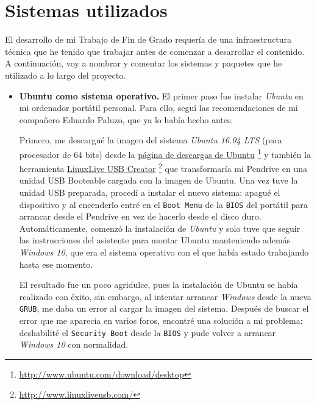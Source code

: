 \section {Sistemas utilizados}

El desarrollo de mi Trabajo de Fin de Grado requería de una infraestructura
técnica que he tenido que trabajar antes de comenzar a desarrollar el contenido.
A continuación, voy a nombrar y comentar los sistemas y paquetes que he utilizado 
a lo largo del proyecto. 

\begin{itemize}
  \item \textbf{Ubuntu como sistema operativo.} El primer paso fue instalar
    \textit{Ubuntu} en mi ordenador portátil personal. Para ello, seguí las 
    recomendaciones de mi compañero Eduardo Paluzo, que ya lo había hecho antes. 

    Primero, me descargué la imagen del sistema \textit{Ubuntu 16.04 LTS} (para 
    procesador de 64 bits) desde la 
    \href{http://www.ubuntu.com/download/desktop}
    {página de descargas de Ubuntu}
    \footnote{\url{http://www.ubuntu.com/download/desktop}} y también la herramienta 
    \href{http://www.linuxliveusb.com/}
    {LinuxLive USB Creator}
    \footnote{\url{http://www.linuxliveusb.com/}} que transformaría mi Pendrive en 
    una unidad USB Booteable cargada con la imagen de Ubuntu. Una vez tuve la unidad
    USB preparada, procedí a instalar el nuevo sistema: apagué el dispositivo y al 
    encenderlo entré en el  \texttt{Boot Menu} de la  \texttt{BIOS} del portátil 
    para arrancar desde el Pendrive en vez de hacerlo desde el disco duro. 
    Automáticamente, comenzó la instalación de  \textit{Ubuntu} y solo tuve que seguir 
    las instrucciones del asistente para montar Ubuntu manteniendo además  
    \textit{Windows 10}, que era el sistema operativo con el que había estado trabajando 
    hasta ese momento.
    
    El resultado fue un poco agridulce, pues la instalación de Ubuntu se había realizado
    con éxito, sin embargo, al intentar arrancar  \textit{Windows} desde la nueva 
     \texttt{GRUB}, me daba un error al cargar la imagen del sistema. Después de buscar 
    el error que me aparecía en varios foros, encontré una solución a mi problema: 
    deshabilité el  \texttt{Security Boot} desde la  \texttt{BIOS} y pude volver a 
    arrancar  \textit{Windows 10} con normalidad.


\end{itemize}
